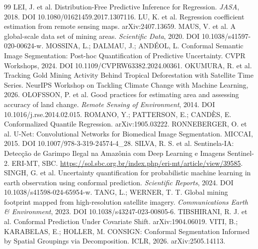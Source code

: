 \documentclass[11pt,a4paper]{article}
\begin{document}
\begin{thebibliography}{99}
 LEI, J. et al. Distribution-Free Predictive Inference for Regression. \emph{JASA}, 2018.
  DOI 10.1080/01621459.2017.1307116.
 LU, K. et al. Regression coefficient estimation from remote sensing maps. arXiv:2407.13659.
 MAUS, V. et al. A global-scale data set of mining areas. \emph{Scientific Data}, 2020.
  DOI 10.1038/s41597-020-00624-w.
 MOSSINA, L.; DALMAU, J.; ANDÉOL, L. Conformal Semantic Image Segmentation:
  Post-hoc Quantification of Predictive Uncertainty. CVPR Workshops, 2024. DOI 10.1109/CVPRW63382.2024.00361.
 OKUMURA, R. et al. Tracking Gold Mining Activity Behind Tropical Deforestation
  with Satellite Time Series. NeurIPS Workshop on Tackling Climate Change with Machine Learning, 2026.
 OLOFSSON, P. et al. Good practices for estimating area and assessing accuracy
  of land change. \emph{Remote Sensing of Environment}, 2014. DOI 10.1016/j.rse.2014.02.015.
 ROMANO, Y.; PATTERSON, E.; CANDÈS, E. Conformalized Quantile Regression.
  arXiv:1905.03222.
 RONNEBERGER, O. et al. U-Net: Convolutional Networks for Biomedical Image
  Segmentation. MICCAI, 2015. DOI 10.1007/978-3-319-24574-4\_28.
 SILVA, R. S. et al. Sentinela-IA: Detecção de Garimpo Ilegal na Amazônia com Deep Learning e
  Imagens Sentinel-2. ERI-MT, SBC. \url{https://sol.sbc.org.br/index.php/eri-mt/article/view/39585}.
 SINGH, G. et al. Uncertainty quantification for probabilistic machine learning in earth
  observation using conformal prediction. \emph{Scientific Reports}, 2024. DOI 10.1038/s41598-024-65954-w.
 TANG, L.; WERNER, T. T. Global mining footprint mapped from high-resolution satellite
  imagery. \emph{Communications Earth \& Environment}, 2023. DOI 10.1038/s43247-023-00805-6.
 TIBSHIRANI, R. J. et al. Conformal Prediction Under Covariate Shift.
  arXiv:1904.06019.
 VITI, B.; KARABELAS, E.; HOLLER, M. CONSIGN: Conformal Segmentation Informed by Spatial
  Groupings via Decomposition. ICLR, 2026. arXiv:2505.14113.
\end{thebibliography}
\end{document}
